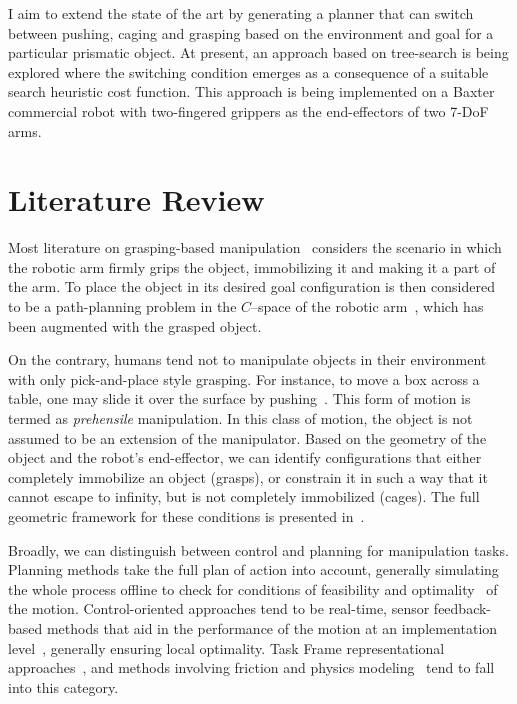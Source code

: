 \documentclass[runningheads,letterpaper]{llncs}
\begin{document}
I aim to extend the state of the art by generating a planner that can switch between pushing, caging and grasping based on the environment and goal for a particular prismatic object. At present, an approach based on tree-search is being explored where the switching condition emerges as a consequence of a suitable search heuristic cost function. This approach is being implemented on a Baxter commercial robot with two-fingered grippers as the end-effectors of two 7-DoF arms.

\section{Literature Review} \label{sec:lit_review}
Most literature on grasping-based manipulation~\cite{prattichizzo2016grasping} considers the scenario in which the robotic arm firmly grips the object, immobilizing it and making it a part of the arm. To place the object in its desired goal configuration is then considered to be a path-planning problem in the $C$--space of the robotic arm~\cite{brock2008motion}, which has been augmented with the grasped object. 

On the contrary, humans tend not to manipulate objects in their environment with only pick-and-place style grasping. For instance, to move a box across a table, one may slide it over the surface by pushing~\cite{chavan2015prehensile}. This form of motion is termed as \textit{prehensile} manipulation. In this class of motion, the object is not assumed to be an extension of the manipulator. Based on the geometry of the object and the robot's end-effector, we can identify configurations that either completely immobilize an object (grasps), or constrain it in such a way that it cannot escape to infinity, but is not completely immobilized (cages). The full geometric framework for these conditions is presented in~\cite{rodriguez2012caging}.

Broadly, we can distinguish between control and planning for manipulation tasks. Planning methods take the full plan of action into account, generally simulating the whole process offline to check for conditions of feasibility and optimality~\cite{kavraki2016motion} of the motion. Control-oriented approaches tend to be real-time, sensor feedback-based methods that aid in the performance of the motion at an implementation level~\cite{dafle2014extrinsic}, generally ensuring local optimality. Task Frame representational approaches~\cite{prats2010framework}, and methods involving friction and physics modeling~\cite{chavan2015prehensile} tend to fall into this category.
\end{document}

